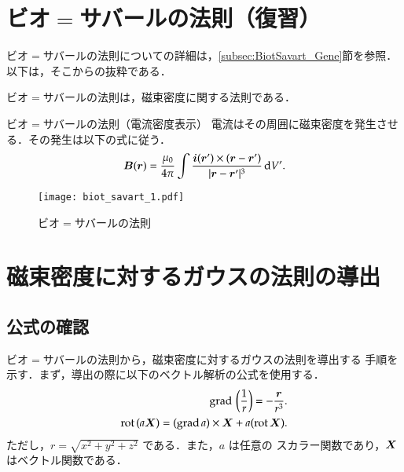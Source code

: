     \section{ビオ$=$サバールの法則（復習）}
        \begin{mycomment}
            ビオ$=$サバールの法則についての詳細は，\ref{subsec:BiotSavart_Gene}節を参照．
            以下は，そこからの抜粋である．
        \end{mycomment}

        ビオ$=$サバールの法則は，磁束密度に関する法則である．
        \begin{myshadebox}{ビオ$=$サバールの法則（電流密度表示）}
            電流はその周囲に磁束密度を発生させる．その発生は以下の式に従う．
            \begin{align}
                \boldsymbol{B}(\boldsymbol{r})
                = \frac{\mu_{0}}{4\pi}
                    \int \frac{ \boldsymbol{i}(\boldsymbol{r}')\times (\boldsymbol{r}-\boldsymbol{r}') }{ |\boldsymbol{r}-\boldsymbol{r}'|^{3} } \,\mathrm{d} V'.
            \end{align}
        \end{myshadebox}
        \begin{figure}[hbt]
            \begin{center}
                \texttt{[image: biot\_savart\_1.pdf]}
                \caption{ビオ$=$サバールの法則}
            \end{center}
        \end{figure}


    \section{磁束密度に対するガウスの法則の導出}
    \subsection{公式の確認}
        ビオ$=$サバールの法則から，磁束密度に対するガウスの法則を導出する
        手順を示す．まず，導出の際に以下のベクトル解析の公式を使用する．
            \begin{align}\label{eq:kousiki_kakunin}
                \dgrad \left( \frac{1}{r} \right) = - \frac{\br}{r^{3}}.  \\
                \drot (a\bX) = (\dgrad a) \times \bX + a(\drot \bX).
            \end{align}
        ただし，$r=\sqrt{x^{2}+y^{2}+z^{2}}$ である．また，$a$ は任意の
        スカラー関数であり，$\boldsymbol{X}$ はベクトル関数である．

